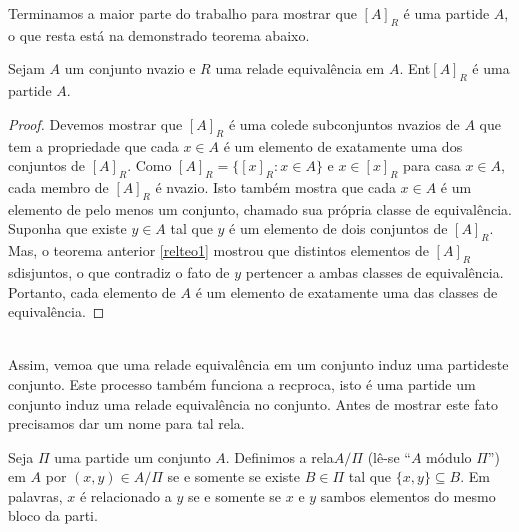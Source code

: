 Terminamos a maior parte do trabalho para mostrar que $[A]_R$ \'e uma parti\caoi de $A$, o que resta est\'a na demonstra\cao do teorema abaixo.
\begin{teob}
Sejam $A$ um conjunto n\ao vazio e $R$ uma rela\cao de equival\^encia em $A$. Ent\ao $[A]_R$ \'e uma parti\cao de $A$.
\end{teob}
\begin{proof}
Devemos mostrar que $[A]_R$ \'e uma cole\cao de subconjuntos n\ao vazios de $A$ que tem a propriedade que cada $x\in A$ \'e um elemento de exatamente uma dos conjuntos de $[A]_R$. Como $[A]_R=\{[x]_R: x\in A\}$ e $x\in[x]_R$ para casa $x\in A$, cada membro de $[A]_R$ \'e n\ao vazio. Isto tamb\'em mostra que cada $x\in A$ \'e um elemento de pelo menos um conjunto, chamado sua pr\'opria classe de equival\^encia. Suponha que existe $y\in A$ tal que $y$ \'e um elemento de dois conjuntos de $[A]_R$. Mas, o teorema anterior \ref{relteo1} mostrou que distintos elementos de $[A]_R$ s\ao disjuntos, o que contradiz o fato de $y$ pertencer a ambas classes de equival\^encia. Portanto, cada elemento de $A$ \'e um elemento de exatamente uma das classes de equival\^encia.
\end{proof}
\\

Assim, vemoa que uma rela\cao de equival\^encia em um conjunto induz uma parti\cao deste conjunto. Este processo tamb\'em funciona a rec\ih proca, isto \'e uma parti\cao de um conjunto induz uma rela\cao de equival\^encia no conjunto. Antes de mostrar este fato precisamos dar um nome para tal rela\caoi. 
\begin{definb}
Seja $\Pi$ uma parti\cao de um conjunto $A$. Definimos a rela\cao $A/\Pi$ (l\^e-se ``$A$ m\'odulo $\Pi$'') em $A$ por $(x,y)\in A/\Pi$ se e somente se existe $B\in\Pi$ tal que $\{x,y\}\subseteq B$. Em palavras, $x$ \'e relacionado a $y$ se e somente se $x$ e $y$ s\ao ambos elementos do mesmo bloco da parti\caoi.
\end{definb}

